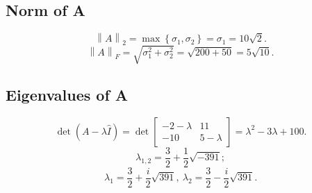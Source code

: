 \documentclass[14pt, notitlepage]{article}
\newcommand{\norm}[1]{\left\lVert#1\right\rVert}
\begin{document}
\subsection*{Norm of A}
\[
    \norm{A}_2 = \max \left\{\sigma_1, \sigma_2\right\} = \sigma_1 = 10\sqrt{2}.
\]
\[
    \norm{A}_F = \sqrt{\sigma_1^2 + \sigma_2^2} = \sqrt{200 + 50} = 5\sqrt{10}.
\]

\subsection*{Eigenvalues of A}
\[
    \det \left(A - \lambda \hat{I}\right) = \det \begin{bmatrix}
        -2 - \lambda & 11 \\
        -10 & 5 - \lambda
    \end{bmatrix} = \lambda^2 - 3\lambda + 100.
\]
\[
    \lambda_{1,2} = \frac 32 + \frac 12 \sqrt{-391};
\]
\[
    \lambda_1 = \frac 32 + \frac i2 \sqrt{391},\ \lambda_2 = \frac 32 - \frac i2 \sqrt{391}.
\]
\end{document}
